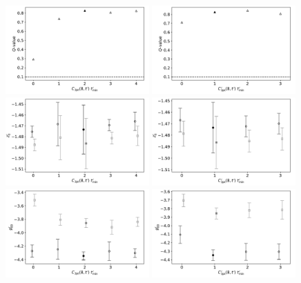 \documentclass[prd,aps,twocolumn,superscriptaddress,tightenlines,nofootinbib,floatfix,preprintnumbers,10pt]{revtex4-1}
\begin{document}
\newpage
\begin{figure}[h]{
		\includegraphics[width=0.49\textwidth]{plots/figures/3296_gV8_Q.pdf}
		\includegraphics[width=0.49\textwidth]{plots/figures/3296_dgV8_Q.pdf}
		\includegraphics[width=0.49\textwidth]{plots/figures/3296_gV8_dZ0.pdf}
		\includegraphics[width=0.49\textwidth]{plots/figures/3296_dgV8_dZ0.pdf}
		\includegraphics[width=0.49\textwidth]{plots/figures/3296_gV8_dgV.pdf}
		\includegraphics[width=0.49\textwidth]{plots/figures/3296_dgV8_dgV.pdf}
}
\end{figure}
\end{document}
